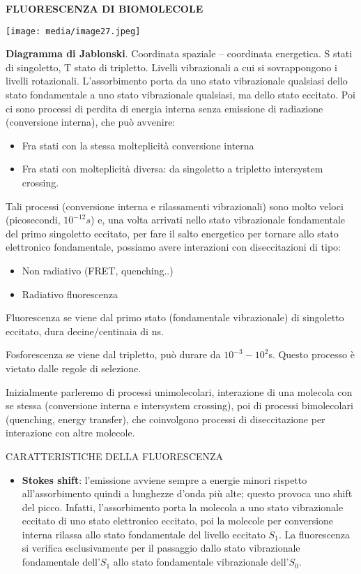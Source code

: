 \textbf{FLUORESCENZA DI BIOMOLECOLE}

\texttt{[image: media/image27.jpeg]}

\textbf{Diagramma di Jablonski}. Coordinata spaziale -- coordinata
energetica. S stati di singoletto, T stato di tripletto. Livelli
vibrazionali a cui si sovrappongono i livelli rotazionali.
L'assorbimento porta da uno stato vibrazionale qualsiasi dello stato
fondamentale a uno stato vibrazionale qualsiasi, ma dello stato
eccitato. Poi ci sono processi di perdita di energia interna senza
emissione di radiazione (conversione interna), che può avvenire:

\begin{itemize}
\item
  Fra stati con la stessa molteplicità conversione interna
\item
  Fra stati con molteplicità diversa: da singoletto a tripletto
  intersystem crossing.
\end{itemize}

Tali processi (conversione interna e rilassamenti vibrazionali) sono
molto veloci (picosecondi, \(10^{- 12}s\)) e, una volta arrivati nello
stato vibrazionale fondamentale del primo singoletto eccitato, per fare
il salto energetico per tornare allo stato elettronico fondamentale,
possiamo avere interazioni con diseccitazioni di tipo:

\begin{itemize}
\item
  Non radiativo (FRET, quenching..)
\item
  Radiativo fluorescenza
\end{itemize}

Fluorescenza se viene dal primo stato (fondamentale vibrazionale) di
singoletto eccitato, dura decine/centinaia di ns.

Fosforescenza se viene dal tripletto, può durare da
\(10^{- 3} - 10^{2}\)s. Questo processo è vietato dalle regole di
selezione.

Inizialmente parleremo di processi unimolecolari, interazione di una
molecola con se stessa (conversione interna e intersystem crossing), poi
di processi bimolecolari (quenching, energy transfer), che coinvolgono
processi di diseccitazione per interazione con altre molecole.

CARATTERISTICHE DELLA FLUORESCENZA

\begin{itemize}
\item
  \textbf{Stokes shift}: l'emissione avviene sempre a energie minori
  rispetto all'assorbimento quindi a lunghezze d'onda più alte; questo
  provoca uno shift del picco. Infatti, l'assorbimento porta la molecola
  a uno stato vibrazionale eccitato di uno stato elettronico eccitato,
  poi la molecole per conversione interna rilassa allo stato
  fondamentale del livello eccitato \(S_{1}\). La fluorescenza si
  verifica esclusivamente per il passaggio dallo stato vibrazionale
  fondamentale dell'\(S_{1}\) allo stato fondamentale vibrazionale
  dell'\(S_{0}\).
\end{itemize}

